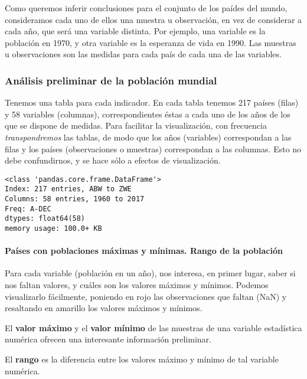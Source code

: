 \documentclass[11pt]{article}
\begin{document}
Como queremos inferir conclusiones para el conjunto de los paídes del
mundo, consideramos cada uno de ellos una muestra u observación, en vez
de considerar a cada año, que será una variable distinta. Por ejemplo,
una variable es la población en 1970, y otra variable es la esperanza de
vida en 1990. Las muestras u observaciones son las medidas para cada
país de cada una de las variables.


    \subsubsection*{Análisis preliminar de la población
mundial}\label{anuxe1lisis-preliminar-de-la-poblaciuxf3n-mundial}

Tenemos una tabla para cada indicador. En cada tabla tenemos 217 países
(filas) y 58 variables (columnas), correspondientes éstas a cada uno de
los años de los que se dispone de medidas. Para facilitar la
visualización, con frecuencia \emph{transpondremos} las tablas, de modo
que los años (variables) correspondan a las filas y los países
(observaciones o muestras) correspondan a las columnas. Esto no debe
confundirnos, y se hace sólo a efectos de visualización.

    \begin{Verbatim}[commandchars=\\\{\}]
<class 'pandas.core.frame.DataFrame'>
Index: 217 entries, ABW to ZWE
Columns: 58 entries, 1960 to 2017
Freq: A-DEC
dtypes: float64(58)
memory usage: 100.0+ KB

    \end{Verbatim}

    \paragraph{Países con poblaciones máximas y mínimas. Rango de la
población}\label{pauxedses-con-poblaciones-muxe1ximas-y-muxednimas.-rango-de-la-poblaciuxf3n}

Para cada variable (población en un año), nos interesa, en primer lugar,
saber si nos faltan valores, y cuáles son los valores máximos y mínimos.
Podemos visualizarlo fácilmente, poniendo en rojo las observaciones que
faltan (NaN) y resaltando en amarillo los valores máximos y mínimos.

El \textbf{valor máximo} y el \textbf{valor mínimo} de las muestras de
una variable estadística numérica ofrecen una interesante información
preliminar.

El \textbf{rango} es la diferencia entre los valores máximo y mínimo de
tal variable numérica.
\end{document}

